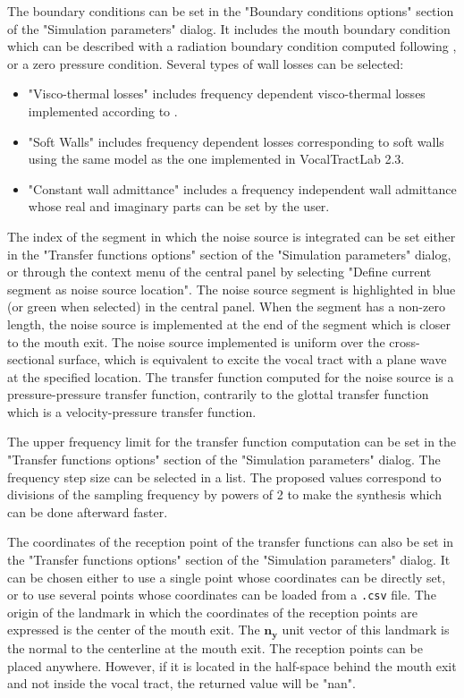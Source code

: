 \documentclass[]{article}
\begin{document}
	The boundary conditions can be set in the "Boundary conditions options" section of the "Simulation parameters" dialog. 
	It includes the mouth boundary condition which can be described
	with a radiation boundary condition computed following 
	\textcite{blandin2019multimodal},
	or a zero pressure condition.
	Several types of wall losses can be selected: 
	\begin{itemize}
		\item "Visco-thermal losses" includes frequency dependent 
		visco-thermal losses implemented according to 
		\textcite{bruneau1987boundary}.
		\item "Soft Walls" includes frequency dependent losses 
		corresponding to soft walls using the same model as the one implemented in 
		VocalTractLab 2.3.
		\item "Constant wall admittance" includes a frequency
		independent wall admittance whose real and imaginary parts 
		can be set by the user.
	\end{itemize}

	The index of the segment in which the noise source is integrated can be 
	set either in the "Transfer functions options" section of the "Simulation parameters"
	dialog, or through the context menu of the central panel by selecting 
	"Define current segment as noise source location". 
	The noise source segment is highlighted in blue (or green when selected) in the 
	central panel.
	When the segment has a non-zero length, the noise source is implemented at 
	the end of the segment which is closer to the mouth exit.
	The noise source implemented is uniform over the cross-sectional surface, which
	is equivalent to excite the vocal tract with a plane wave at the specified location.
	The transfer function computed for the noise source is a pressure-pressure 
	transfer function, contrarily to the glottal transfer function which is a 
	velocity-pressure transfer function.
	
	The upper frequency limit for the transfer function computation can be set
	in the "Transfer functions options" section of the "Simulation parameters" dialog.
	The frequency step size can be selected in a list. 
	The proposed values correspond to divisions of the sampling frequency by powers
	of 2 to make the synthesis which can be done afterward faster.
	
	The coordinates of the reception point of the transfer functions can also be set
	in the "Transfer functions options" section of the "Simulation parameters" dialog.
	It can be chosen either to use a single point whose coordinates can be 
	directly set, or to use several points whose coordinates can be loaded from
	a \texttt{.csv} file. 
	The origin of the landmark in which the coordinates of the reception points are
	expressed is the center of the mouth exit. 
	The $\bm{n_y}$ unit vector of this landmark is the normal to the centerline
	at the mouth exit.
	The reception points can be placed anywhere. 
	However, if it is located in the half-space behind the mouth exit and not 
	inside the vocal tract, the returned value will be "nan".
	
\end{document}
